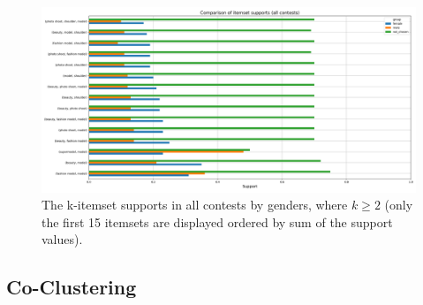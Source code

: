 \begin{figure}[h] 
    \begin{center}
        \includegraphics[width=1.0\textwidth]{Images/itemset_supports-gender-all_contests-over2_itemset.png}
        \caption{The k-itemset supports in all contests by genders, where $k \geq 2$ (only the first 15 itemsets are displayed ordered by sum of the support values).}
        \label{itemset_supports-gender-all_contests-over2_itemset}
    \end{center}
\end{figure}

\subsection{Co-Clustering}
